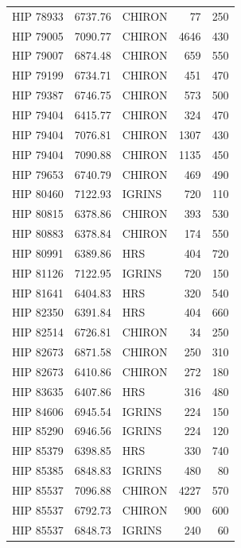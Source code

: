 \begin{scriptsize}
\begin{longtable}{|l|rlrr|}
   HIP 78933 &  6737.76 &     CHIRON &       77 &   250 \\
   HIP 79005 &  7090.77 &     CHIRON &     4646 &   430 \\
   HIP 79007 &  6874.48 &     CHIRON &      659 &   550 \\
   HIP 79199 &  6734.71 &     CHIRON &      451 &   470 \\
   HIP 79387 &  6746.75 &     CHIRON &      573 &   500 \\
   HIP 79404 &  6415.77 &     CHIRON &      324 &   470 \\
   HIP 79404 &  7076.81 &     CHIRON &     1307 &   430 \\
   HIP 79404 &  7090.88 &     CHIRON &     1135 &   450 \\
   HIP 79653 &  6740.79 &     CHIRON &      469 &   490 \\
   HIP 80460 &  7122.93 &     IGRINS &      720 &   110 \\
   HIP 80815 &  6378.86 &     CHIRON &      393 &   530 \\
   HIP 80883 &  6378.84 &     CHIRON &      174 &   550 \\
   HIP 80991 &  6389.86 &        HRS &      404 &   720 \\
   HIP 81126 &  7122.95 &     IGRINS &      720 &   150 \\
   HIP 81641 &  6404.83 &        HRS &      320 &   540 \\
   HIP 82350 &  6391.84 &        HRS &      404 &   660 \\
   HIP 82514 &  6726.81 &     CHIRON &       34 &   250 \\
   HIP 82673 &  6871.58 &     CHIRON &      250 &   310 \\
   HIP 82673 &  6410.86 &     CHIRON &      272 &   180 \\
   HIP 83635 &  6407.86 &        HRS &      316 &   480 \\
   HIP 84606 &  6945.54 &     IGRINS &      224 &   150 \\
   HIP 85290 &  6946.56 &     IGRINS &      224 &   120 \\
   HIP 85379 &  6398.85 &        HRS &      330 &   740 \\
   HIP 85385 &  6848.83 &     IGRINS &      480 &    80 \\
   HIP 85537 &  7096.88 &     CHIRON &     4227 &   570 \\
   HIP 85537 &  6792.73 &     CHIRON &      900 &   600 \\
   HIP 85537 &  6848.73 &     IGRINS &      240 &    60 \\

\end{longtable}
\end{scriptsize}
